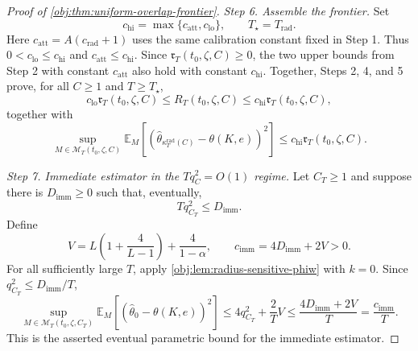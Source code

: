 \begin{proof}[Proof of \cref{obj:thm:uniform-overlap-frontier}]
\emph{Step 6. Assemble the frontier.}
Set
\[
c_{\mathrm{hi}}=\max\{c_{\mathrm{att}},c_{\mathrm{lo}}\},
\qquad
T_\star=T_{\mathrm{rad}}.
\]
Here \(c_{\mathrm{att}}=A(c_{\mathrm{rad}}+1)\) uses the same calibration constant
fixed in Step 1.  Thus \(0<c_{\mathrm{lo}}\le c_{\mathrm{hi}}\) and
\(c_{\mathrm{att}}\le c_{\mathrm{hi}}\).  Since
\(\mathfrak r_T(t_0,\zeta,C)\ge0\), the two upper bounds from Step 2 with constant
\(c_{\mathrm{att}}\) also hold with constant \(c_{\mathrm{hi}}\).  Together,
Steps 2, 4, and 5 prove, for all \(C\ge1\) and \(T\ge T_\star\),
\[
c_{\mathrm{lo}}\mathfrak r_T(t_0,\zeta,C)
\le
R_T(t_0,\zeta,C)
\le
c_{\mathrm{hi}}\mathfrak r_T(t_0,\zeta,C),
\]
together with
\[
\sup_{M\in\mathcal M_T(t_0,\zeta,C)}
\mathbb E_M[
(\widehat\theta_{\kappa_T^{\mathrm{rad}}(C)}-\theta(K,e))^2]
\le
c_{\mathrm{hi}}\mathfrak r_T(t_0,\zeta,C).
\] %

\emph{Step 7. Immediate estimator in the \(Tq_C^2=O(1)\) regime.}
Let \(C_T\ge1\) and suppose there is \(D_{\mathrm{imm}}\ge0\) such that,
eventually,
\[
Tq_{C_T}^2\le D_{\mathrm{imm}} .
\]
Define
\[
V=L\left(1+\frac4{L-1}\right)+\frac4{1-\alpha},
\qquad
c_{\mathrm{imm}}=4D_{\mathrm{imm}}+2V>0.
\]
For all sufficiently large \(T\), apply
\cref{obj:lem:radius-sensitive-phiw} with \(k=0\).  Since
\(q_{C_T}^2\le D_{\mathrm{imm}}/T\),
\[
\sup_{M\in\mathcal M_T(t_0,\zeta,C_T)}
\mathbb E_M[(\widehat\theta_0-\theta(K,e))^2]
\le
4q_{C_T}^2+\frac2T V
\le
\frac{4D_{\mathrm{imm}}+2V}{T}
=
\frac{c_{\mathrm{imm}}}{T}.
\]
This is the asserted eventual parametric bound for the immediate estimator. %
\end{proof}

